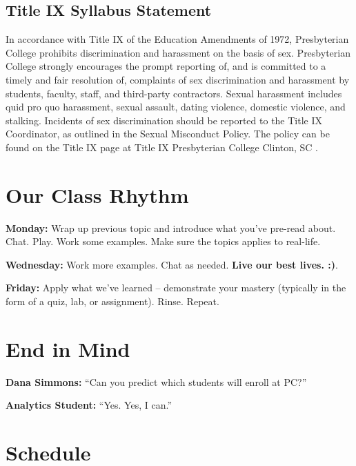 \documentclass[
]{book}
\begin{document}
\hypertarget{title-ix-syllabus-statement}{%
\section{Title IX Syllabus Statement}\label{title-ix-syllabus-statement}}

In accordance with Title IX of the Education Amendments of 1972, Presbyterian College prohibits discrimination and harassment on the basis of sex. Presbyterian College strongly encourages the prompt reporting of, and is committed to a timely and fair resolution of, complaints of sex discrimination and harassment by students, faculty, staff, and third-party contractors. Sexual harassment includes quid pro quo harassment, sexual assault, dating violence, domestic violence, and stalking. Incidents of sex discrimination should be reported to the Title IX Coordinator, as outlined in the Sexual Misconduct Policy. The policy can be found on the Title IX page at Title IX \textbar{} Presbyterian College \textbar{} Clinton, SC .

\hypertarget{our-class-rhythm}{%
\chapter{Our Class Rhythm}\label{our-class-rhythm}}

\textbf{Monday:} Wrap up previous topic and introduce what you've pre-read about. Chat. Play. Work some examples. Make sure the topics applies to real-life.

\textbf{Wednesday:} Work more examples. Chat as needed. \textbf{Live our best lives. :)}.

\textbf{Friday:} Apply what we've learned -- demonstrate your mastery (typically in the form of a quiz, lab, or assignment). Rinse. Repeat.

\hypertarget{end-in-mind}{%
\chapter{End in Mind}\label{end-in-mind}}

\textbf{Dana Simmons:} ``Can you predict which students will enroll at PC?''

\textbf{Analytics Student:} ``Yes. Yes, I can.''

\hypertarget{schedule}{%
\chapter{Schedule}\label{schedule}}
\end{document}
